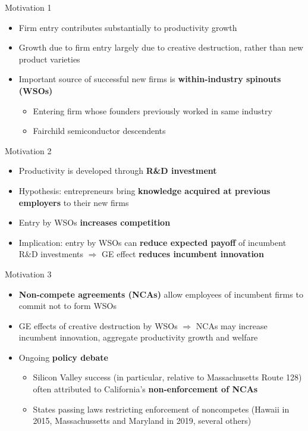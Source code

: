 \documentclass[english,usenames,dvipsnames]{beamer}
\begin{document}
\begin{frame}{Motivation 1}
\begin{itemize}
	\item Firm entry contributes substantially to productivity growth
	\item Growth due to firm entry largely due to creative destruction, rather than new product varieties
	\item Important source of successful new firms is \alert{\textbf{within-industry spinouts (WSOs)}}
	\begin{itemize}
		\item Entering firm whose founders previously worked in same industry 
		\hyperlink{spinouts_facts_from_literature}{}
		\item Fairchild semiconductor descendents \hyperlink{fairchildren_early}{}
	\end{itemize}
\end{itemize}
\end{frame}

\begin{frame}{Motivation 2}
\begin{itemize}
	\item Productivity is developed through \alert{\textbf{R\&D investment}}
	\item Hypothesis: entrepreneurs bring \alert{\textbf{\textbf{knowledge acquired at previous employers}}} to their new firms
	\item Entry by WSOs \alert{\textbf{increases competition}}
	\item Implication: entry by WSOs can \alert{\textbf{reduce expected payoff}} of incumbent R\&D investments $\Rightarrow$ GE effect \alert{\textbf{reduces incumbent innovation}}
\end{itemize}
\end{frame}

\begin{frame}{Motivation 3}
\begin{itemize}
	\item \alert{\textbf{Non-compete agreements (NCAs)}} allow employees of incumbent firms to commit not to form WSOs
	\item GE effects of creative destruction by WSOs $\Rightarrow$ NCAs may increase incumbent innovation, aggregate productivity growth and welfare
	\item Ongoing \alert{\textbf{policy debate}}
	\begin{itemize}
		\item Silicon Valley success (in particular, relative to Massachusetts Route 128) often attributed to California's \alert{\textbf{non-enforcement of NCAs}}
		\item States passing laws restricting enforcement of noncompetes (Hawaii in 2015, Massachussetts and Maryland in 2019, several others)
	\end{itemize}
\end{itemize}
\end{frame}
\end{document}
